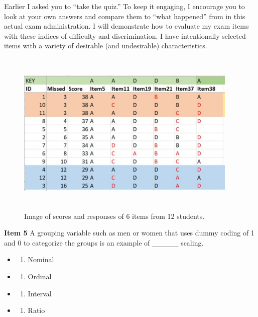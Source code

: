 \documentclass[
  english,
]{book}
\providecommand{\tightlist}{%
  \setlength{\itemsep}{0pt}\setlength{\parskip}{0pt}}
\begin{document}
Earlier I asked you to ``take the quiz.'' To keep it engaging, I encourage you to look at your own answers and compare them to ``what happened'' from in this actual exam administration. I will demonstrate how to evaluate my exam items with these indices of difficulty and discrimination. I have intentionally selected items with a variety of desirable (and undesirable) characteristics.

\begin{figure}
\hypertarget{id}{%
\centering
\includegraphics[width=4.16667in,height=3.125in]{images/ItemAnalExam/ULchart.jpg}
\caption{Image of scores and responses of 6 items from 12 students.}\label{id}
}
\end{figure}

\textbf{Item 5} A grouping variable such as men or women that uses dummy coding of 1 and 0 to categorize the groups is an example of \_\_\_\_\_ scaling.

\begin{itemize}
\item
  \begin{enumerate}
  \def\labelenumi{\alph{enumi})}
  \tightlist
  \item
    Nominal
  \end{enumerate}
\item
  \begin{enumerate}
  \def\labelenumi{\alph{enumi})}
  \setcounter{enumi}{1}
  \tightlist
  \item
    Ordinal
  \end{enumerate}
\item
  \begin{enumerate}
  \def\labelenumi{\alph{enumi})}
  \setcounter{enumi}{2}
  \tightlist
  \item
    Interval
  \end{enumerate}
\item
  \begin{enumerate}
  \def\labelenumi{\alph{enumi})}
  \setcounter{enumi}{3}
  \tightlist
  \item
    Ratio
  \end{enumerate}
\end{itemize}
\end{document}
